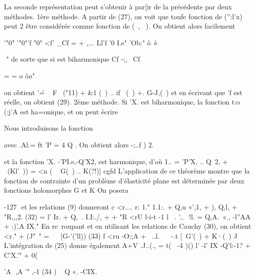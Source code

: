 {{La seconde représentation peut s'obtenir à par[ir de la précédente par deux 
méthodes. 
1ère méthode. A partir de (27), on voit que toufe fonction de ('':l'x) peut
2
être considérée comme fonction de (~,~ ). On obtient alors facilement 

'"0" '"0"'f "0" <f'
_Cf
= + ,...
Ll'f '0 I.e" 'Ob:" ô~è~

 
" 
de sorte que si est biharmonique
Cf 
-;,~ Cf 


= = o 
ô\o"} 
on obtient 
'\' = ~ F~ ("11) + &1 (~) .. if ~(~) +. G-J,(~) 
et en écrivant que 'f est réelle, on obtient (29). 
2ème méthode. Si 'X. est biharmonique, la fonction t:o (:j'A est ha=onique, et on peut écrire 

Nous introduisons la fonction 

avec .Al.= ft 'P = 4 Q . On obtient alors 
-\-;..f ) 2.­

et la fonction 'X. -'PI.e,-Q'X2, est harmonique, d'où 1.. = 'P'X, .. Q~2, + ~(Kl'~)) = <n ( ~ G(~) .. K(?!)] cgfd L'application de ce théorème montre que la fonction de contrainte d'un problème d'élasticité plane est déterminée par deux fonctions holomor­phes G et K On posera 

-127 ­
et les relations (9) donneront 
c
<r.... r: 1." 1.1:. + Q,u «',1, + ), Q,l, + "R,,,2. 
(32) = l' Ir. + Q,~. I.I:./, + + "R
<rU l-i-t -1 l ~. '., ~!l. = Q,A.\ «., -l''AA + :)'.A
IX." 
En re~roupant et en utilisant les relations de Cauchy (30), on obtient 
<r." + (J"~" = ~ ~[G-'('ll))
(33) 
f <ru -O:;A + ~..l. ~~ -.t [~G'(~) + K·(~) J 
L'intégration de (25) donne également 
A+V 
.J..(., = t(~ -4 )() l' -l' IX -Q'l:-1? + C'X.'" + 0( }
'A  ,A '" ,-1
(34 ) ~ 
Q «. -CIX.

